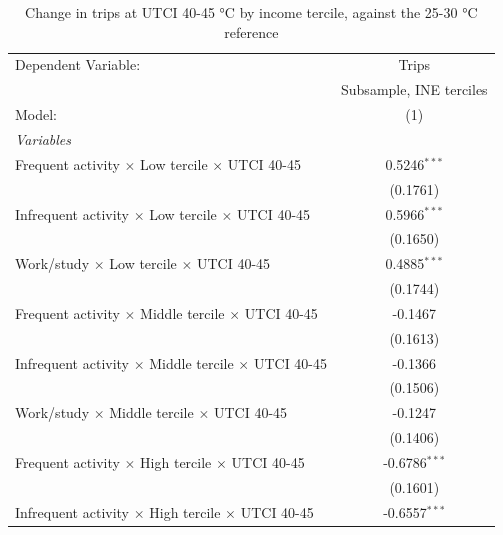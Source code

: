
\begin{table}[htbp]
   \caption{\label{table_model_d_40-45} Change in trips at UTCI 40-45 °C by income tercile, against the 25-30 °C reference}
   \centering
   \small
   \begin{tabular}{lc}
      \tabularnewline \midrule \midrule
      Dependent Variable:                                               & Trips\\  
                                                                        & Subsample, INE terciles \\   
      Model:                                                            & (1)\\  
      \midrule
      \emph{Variables}\\
      Frequent activity $\times$ Low tercile $\times$ UTCI 40-45        & 0.5246$^{***}$\\   
                                                                        & (0.1761)\\   
      Infrequent activity $\times$ Low tercile $\times$ UTCI 40-45      & 0.5966$^{***}$\\   
                                                                        & (0.1650)\\   
      Work/study $\times$ Low tercile $\times$ UTCI 40-45               & 0.4885$^{***}$\\   
                                                                        & (0.1744)\\   
      Frequent activity $\times$ Middle tercile $\times$ UTCI 40-45     & -0.1467\\   
                                                                        & (0.1613)\\   
      Infrequent activity $\times$ Middle tercile $\times$ UTCI 40-45   & -0.1366\\   
                                                                        & (0.1506)\\   
      Work/study $\times$ Middle tercile $\times$ UTCI 40-45            & -0.1247\\   
                                                                        & (0.1406)\\   
      Frequent activity $\times$ High tercile $\times$ UTCI 40-45       & -0.6786$^{***}$\\   
                                                                        & (0.1601)\\   
      Infrequent activity $\times$ High tercile $\times$ UTCI 40-45     & -0.6557$^{***}$\\   

\end{tabular}
\end{table}
